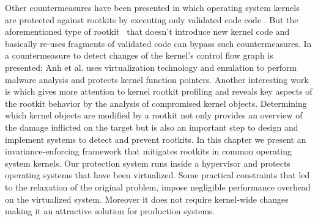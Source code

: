 Other countermeasures have been presented in which operating system kernels are protected against rootkits by executing only validated code code \cite{SecVisor,NICKLE,5}. But the aforementioned type of rootkit~\cite{Hund2009} that doesn't introduce new kernel code and basically re-uses fragments of validated code can bypass such countermeasures.
In \cite{4} a countermeasure to detect changes of the kernel's control flow graph is presented; Anh et al. \cite{MAVMM} uses virtualization technology and emulation to perform malware analysis and \cite{HookSafe} protects kernel function pointers. Another interesting work is \cite{PoKer} which gives more attention to kernel rootkit profiling and reveals key aspects of the rootkit behavior by the analysis of compromised kernel objects. 
Determining which kernel objects are modified by a rootkit not only provides an overview of the damage inflicted on the target but is also an important step to design and implement systems to detect and prevent rootkits.
In this chapter we present an invariance-enforcing framework that mitigates rootkits in common operating system kernels. 
Our protection system runs inside a hypervisor and protects operating systems that have been virtualized. 
Some practical constraints that led to the relaxation of the original problem, impose negligible performance overhead on the virtualized system.
Moreover it does not require kernel-wide changes making it an attractive solution for production systems.
